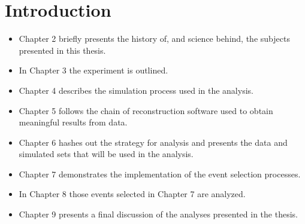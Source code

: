 
\chapter{Introduction}
\label{intro_chapter}

\begin{itemize}


\item Chapter 2 briefly presents the history of, and science behind, the
subjects presented in this thesis.

\item In Chapter 3 the experiment is outlined.

\item Chapter 4 describes the simulation process used in the analysis.

\item Chapter 5 follows the chain of reconstruction software used to obtain
meaningful results from data.

\item Chapter 6 hashes out the strategy for analysis and presents the data and
simulated sets that will be used in the analysis.

\item Chapter 7 demonstrates the implementation of the event selection
processes.

\item In Chapter 8 those events selected in Chapter 7 are analyzed.

\item Chapter 9 presents a final discussion of the analyses presented in the
thesis.

\end{itemize}
